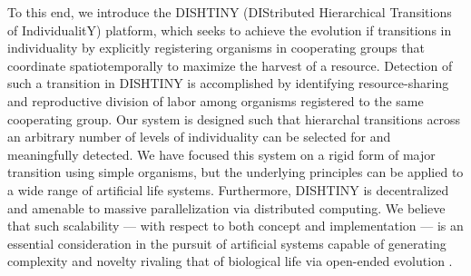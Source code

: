 To this end, we introduce the DISHTINY (DIStributed Hierarchical Transitions of IndividualitY) platform, which seeks to achieve the evolution if transitions in individuality by explicitly registering organisms in cooperating groups that coordinate spatiotemporally to maximize the harvest of a resource.
Detection of such a transition in DISHTINY is accomplished by identifying resource-sharing and reproductive division of labor among organisms registered to the same cooperating group.
Our system is designed such that hierarchal transitions across an arbitrary number of levels of individuality can be selected for and meaningfully detected.
We have focused this system on a rigid form of major transition using simple organisms, but the underlying principles can be applied to a wide range of artificial life systems.
Furthermore, DISHTINY is decentralized and amenable to massive parallelization via distributed computing.
We believe that such scalability --- with respect to both concept and implementation --- is an essential consideration in the pursuit of artificial systems capable of generating complexity and novelty rivaling that of biological life via open-ended evolution \citep{ackley2011pursue, ackley2016indefinite}.
